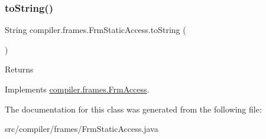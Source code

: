 \subsubsection{\texorpdfstring{to\+String()}{toString()}}
{\footnotesize\ttfamily String compiler.\+frames.\+Frm\+Static\+Access.\+to\+String (\begin{DoxyParamCaption}{ }\end{DoxyParamCaption})}

\begin{DoxyReturn}{Returns}

\end{DoxyReturn}


Implements \hyperlink{interfacecompiler_1_1frames_1_1_frm_access}{compiler.\+frames.\+Frm\+Access}.



The documentation for this class was generated from the following file\+:\begin{DoxyCompactItemize}
\item 
src/compiler/frames/Frm\+Static\+Access.\+java\end{DoxyCompactItemize}
